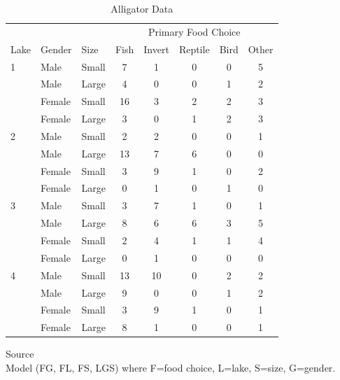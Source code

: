 \documentclass[a4paper]{article}
\begin{document}
\begin{appendix}
\begin{table}[H]
\begin{center}
\begin{tabular}{lllccccc} \hline
& & & \multicolumn{5}{c}{Primary Food Choice} \\ \cline{4-8}
Lake & Gender & Size & Fish & Invert & Reptile & Bird & Other \\ \hline
1 & Male   & Small & 7  & 1  & 0 & 0 & 5 \\
  & Male   & Large & 4  & 0  & 0 & 1 & 2 \\
  & Female & Small & 16 & 3  & 2 & 2 & 3 \\
  & Female & Large & 3  & 0  & 1 & 2 & 3 \\
2 & Male   & Small & 2  & 2  & 0 & 0 & 1 \\
  & Male   & Large & 13 & 7  & 6 & 0 & 0 \\
  & Female & Small & 3  & 9  & 1 & 0 & 2 \\
  & Female & Large & 0  & 1  & 0 & 1 & 0 \\
3 & Male   & Small & 3  & 7  & 1 & 0 & 1 \\
  & Male   & Large & 8  & 6  & 6 & 3 & 5 \\
  & Female & Small & 2  & 4  & 1 & 1 & 4 \\
  & Female & Large & 0  & 1  & 0 & 0 & 0 \\
4 & Male   & Small & 13 & 10 & 0 & 2 & 2 \\
  & Male   & Large & 9  &  0 & 0 & 1 & 2 \\
  & Female & Small & 3  &  9 & 1 & 0 & 1 \\
  & Female & Large & 8  &  1 & 0 & 0 & 1 \\ \hline      
\end{tabular}
\caption{Alligator Data}
\label{tab:alli}
\end{center}
Source \cite{agre:1990} \\
Model (FG, FL, FS, LGS) where F=food choice, L=lake, S=size, G=gender.
\end{table}


\end{appendix}
\end{document}
